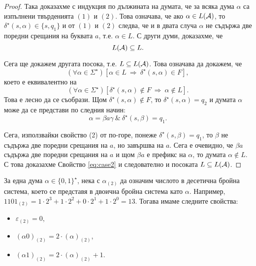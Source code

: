\begin{proof}
 Така доказахме с индукция по дължината на думата, че за всяка дума $\alpha$
 са  изпълнени твърденията $(1)$ и $(2)$. Това означава, че ако $\alpha \in L(\mathcal{A})$,
 то $\delta^\star(s,\alpha) \in \{s,q_1\}$ и от $(1)$ и $(2)$ следва, че и в двата случа
 $\alpha$ не съдържа две поредни срещания на буквата $a$, т.е. $\alpha \in L$.
 С други думи, доказахме, че 
 \[L(\mathcal{A}) \subseteq L.\]

 Сега ще докажем другата посока, т.е. $L \subseteq L(\mathcal{A})$.
 Това означава да докажем, че
 \[(\forall \alpha \in \Sigma^\star)[\alpha \in L\ \Rightarrow\ \delta^\star(s,\alpha) \in F],\]
 което е еквивалентно на
 \begin{equation}
   \label{eq:case2}
   (\forall \alpha \in \Sigma^\star)[\delta^\star(s,\alpha) \not\in F \ \Rightarrow\ \alpha\not\in L].
 \end{equation}
 Това е лесно да се съобрази.
 Щом $\delta^\star(s,\alpha) \not\in F$, то 
 $\delta^\star(s,\alpha) = q_2$ и думата $\alpha$ може да се представи по следния начин:
 \[\alpha = \beta a \gamma\ \&\ \delta^\star(s,\beta) = q_1.\]
 
 Сега, използвайки свойство (2) от по-горе, понеже $\delta^\star(s,\beta) = q_1$, то
 $\beta$ не съдържа две поредни срещания на $a$, но завършва на $a$.
 Сега е очевидно, че $\beta a$ съдържа две поредни срещания на $a$ и 
 щом $\beta a$ е префикс на $\alpha$, то думата $\alpha \not\in L$.
 С това доказахме Свойство \ref{eq:case2} и следователно и посоката $L\subseteq L(\mathcal{A})$.
\end{proof}

\begin{framed}
  За една дума $\alpha \in \{0,1\}^\star$, 
  нека с $\alpha_{(2)}$ да означим числото в десетична бройна система, което се представя в двоична бройна система като $\alpha$.
  Например, $1101_{(2)} = 1 \cdot 2^3+1\cdot 2^2+0\cdot 2^1+1\cdot 2^0 = 13$.
  Тогава имаме следните свойства:
  \begin{itemize}
  \item
    $\varepsilon_{(2)} = 0$,
  \item
    $(\alpha0)_{(2)} = 2\cdot(\alpha)_{(2)}$,
  \item
    $(\alpha1)_{(2)} = 2\cdot(\alpha)_{(2)} + 1$.
  \end{itemize}
\end{framed}

